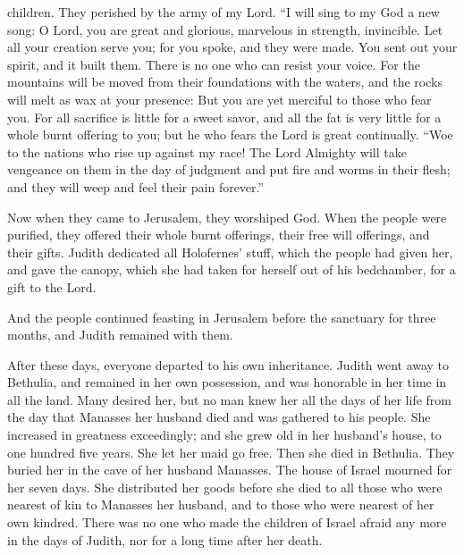 children. They perished by the army of my Lord.  ``I will
sing to my God a new song: O Lord, you are great and glorious, marvelous
in strength, invincible.  Let all your creation serve you;
for you spoke, and they were made. You sent out your spirit, and it
built them. There is no one who can resist your voice.  For
the mountains will be moved from their foundations with the waters, and
the rocks will melt as wax at your presence: But you are yet merciful to
those who fear you.  For all sacrifice is little for a
sweet savor, and all the fat is very little for a whole burnt offering
to you; but he who fears the Lord is great continually. 
``Woe to the nations who rise up against my race! The Lord Almighty will
take vengeance on them in the day of judgment and put fire and worms in
their flesh; and they will weep and feel their pain forever.''

 Now when they came to Jerusalem, they worshiped God. When
the people were purified, they offered their whole burnt offerings,
their free will offerings, and their gifts.  Judith
dedicated all Holofernes' stuff, which the people had given her, and
gave the canopy, which she had taken for herself out of his bedchamber,
for a gift to the Lord.

 And the people continued feasting in Jerusalem before the
sanctuary for three months, and Judith remained with them.

 After these days, everyone departed to his own
inheritance. Judith went away to Bethulia, and remained in her own
possession, and was honorable in her time in all the land. 
Many desired her, but no man knew her all the days of her life from the
day that Manasses her husband died and was gathered to his people.
 She increased in greatness exceedingly; and she grew old
in her husband's house, to one hundred five years. She let her maid go
free. Then she died in Bethulia. They buried her in the cave of her
husband Manasses.  The house of Israel mourned for her
seven days. She distributed her goods before she died to all those who
were nearest of kin to Manasses her husband, and to those who were
nearest of her own kindred.  There was no one who made the
children of Israel afraid any more in the days of Judith, nor for a long
time after her death.
